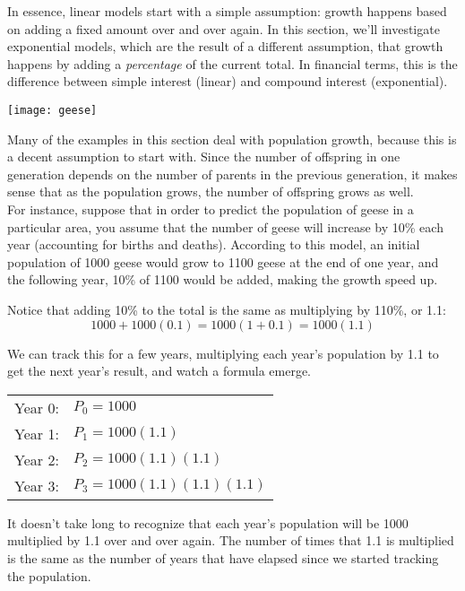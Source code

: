\setcounter{ExampleCounter}{1}
In essence, linear models start with a simple assumption: growth happens based on adding a fixed amount over and over again.  In this section, we'll investigate exponential models, which are the result of a different assumption, that growth happens by adding a \emph{percentage} of the current total.  In financial terms, this is the difference between simple interest (linear) and compound interest (exponential).

\begin{center}
\texttt{[image: geese]}
\end{center}

Many of the examples in this section deal with population growth, because this is a decent assumption to start with.  Since the number of offspring in one generation depends on the number of parents in the previous generation, it makes sense that as the population grows, the number of offspring grows as well.\\

For instance, suppose that in order to predict the population of geese in a particular area, you assume that the number of geese will increase by 10\% each year (accounting for births and deaths).  According to this model, an initial population of 1000 geese would grow to 1100 geese at the end of one year, and the following year, 10\% of 1100 would be added, making the growth speed up.

Notice that adding 10\% to the total is the same as multiplying by 110\%, or 1.1:
\[1000 + 1000(0.1) = 1000(1+0.1) = 1000(1.1)\]

We can track this for a few years, multiplying each year's population by 1.1 to get the next year's result, and watch a formula emerge.
\begin{center}
\begin{tabular}{l l}
Year 0: \hspace*{0.25in} & $P_0 = 1000$\\
Year 1: & $P_1 = 1000(1.1)$\\
Year 2: & $P_2 = 1000(1.1)(1.1)$\\
Year 3: & $P_3 = 1000(1.1)(1.1)(1.1)$
\end{tabular}
\end{center}

It doesn't take long to recognize that each year's population will be 1000 multiplied by 1.1 over and over again.  The number of times that 1.1 is multiplied is the same as the number of years that have elapsed since we started tracking the population.

